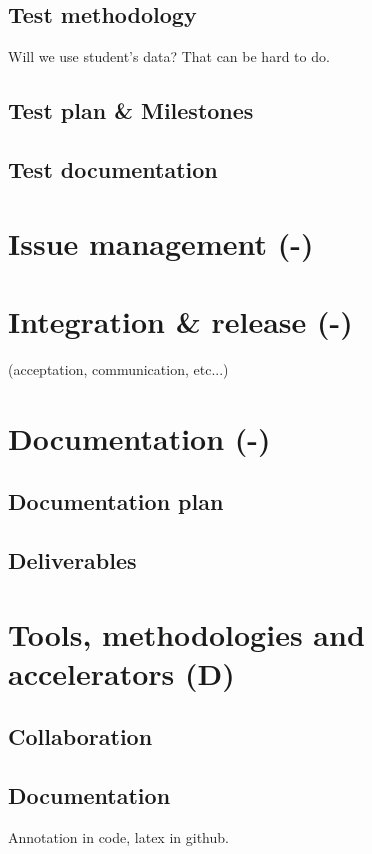 \documentclass[a4paper,12pt,abstracton,titlepage]{scrartcl}
\begin{document}
\subsection{Test methodology}
Will we use student's data? That can be hard to do.

\subsection{Test plan \& Milestones}
\lipsum[1]
\subsection{Test documentation}
\lipsum[1]

\section{Issue management (-)}
\label{sec:issue-management}

\section{Integration \& release (-)}
\label{sec:integration-release}
(acceptation, communication, etc...)

\section{Documentation (-)}
\label{sec:documentation}
\subsection{Documentation plan}
\lipsum[1]
\subsection{Deliverables}
\lipsum[1]

\section{Tools, methodologies and accelerators (D)}
\label{sec:tools-methodologies}
\subsection{Collaboration}
\lipsum[1]

\subsection{Documentation}
Annotation in code, latex in github.
\end{document}
